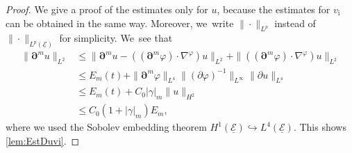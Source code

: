 \documentclass[10pt]{amsart}
\newcommand{\cE}{{\mathcal E}}
\newcommand{\ul}[1]{\underline{#1}}
\theoremstyle{definition}
\begin{document}
\begin{proof}
We give a proof of the estimates only for $u$, because the estimates for $v_\mathrm{i}$ can be obtained in the same way.
Moreover, we~write $\|\cdot\|_{L^p}$ instead of $\|\cdot\|_{L^p(\ul{\cE})}$ for simplicity. We~see that
\begin{align*}
\|\bm{\partial}^m u\|_{L^2}
&\leq \|\bm{\partial}^m u - ((\bm{\partial}^m\varphi)\cdot\nabla^\varphi)u\|_{L^2}
+ \|((\bm{\partial}^m\varphi)\cdot\nabla^\varphi)u\|_{L^2} \\
&\leq E_m(t) + \|\bm{\partial}^m\varphi\|_{L^4} \|(\partial\varphi)^{-1}\|_{L^\infty} \|\partial u\|_{L^4} \\
&\leq E_m(t) + C_0|\gamma|_m \|u\|_{H^2} \\
&\leq C_0(1+|\gamma|_m)E_m,
\end{align*}
where we used the Sobolev embedding theorem $H^1(\ul{\cE}) \hookrightarrow L^4(\ul{\cE})$.
This shows \eqref{lem:EstDuvi}.


\end{proof}
\end{document}
